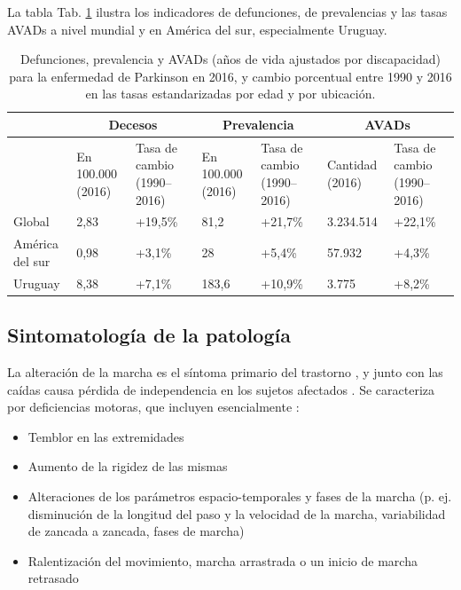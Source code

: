 \noindent La tabla Tab. \ref{ep_paises} ilustra los indicadores de defunciones, de prevalencias y las tasas AVADs a nivel mundial y en América del sur, especialmente Uruguay.

\begin{table}[H]
\begin{center}
\caption{Defunciones, prevalencia y AVADs (años de vida ajustados por discapacidad) para la enfermedad de Parkinson en 2016, y cambio porcentual entre 1990 y 2016 en las tasas estandarizadas por edad y por ubicación. \cite{Dorsey2018}} \label{ep_paises}
\hspace*{-2cm}%
\begin{tabular}{|p{2cm}|p{2cm}|p{2cm}|p{2cm}|p{2cm}|p{2cm}|p{2cm}|}
\hline
 & \multicolumn{2}{c|}{Decesos} & \multicolumn{2}{c|}{Prevalencia} & \multicolumn{2}{c|}{AVADs} \\
\hline
& En 100.000 (2016) & Tasa de cambio (1990–2016) & En 100.000 (2016) & Tasa de cambio (1990–2016) & Cantidad (2016) & Tasa de cambio (1990–2016) \\
\hline
Global & 2,83 & +19,5\% & 81,2 & +21,7\% & 3.234.514 & +22,1\% \\
\hline
América del sur & 0,98  & +3,1\% & 28 &  +5,4\% & 57.932 & +4,3\% \\
\hline
Uruguay & 8,38 & +7,1\% & 183,6 & +10,9\% & 3.775 & +8,2\% \\ \hline
\end{tabular}
\end{center}
\end{table}

\subsection{Sintomatología de la patología}

La alteración de la marcha es el síntoma primario del trastorno \cite{Jankovic}, y junto con las caídas causa pérdida de independencia en los sujetos afectados \cite{Ashburn}. Se caracteriza por deficiencias motoras, que incluyen esencialmente \cite{Rogers,Stamatakis,Hausdorff,Lord}: 
\begin{itemize}
    \item Temblor en las extremidades
    \item Aumento de la rigidez de las mismas
    \item Alteraciones de los parámetros espacio-temporales y fases de la marcha (p. ej. disminución de la longitud del paso y la velocidad de la marcha, variabilidad de zancada a zancada, fases de marcha)
    \item Ralentización del movimiento, marcha arrastrada o un inicio de marcha retrasado 
\end{itemize}

